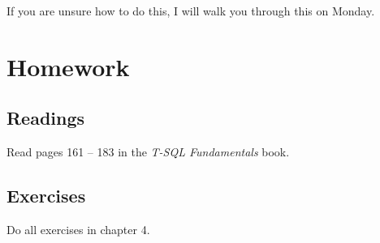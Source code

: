 \documentclass{article}
\begin{document}
        If you are unsure how to do this, I will walk you through this on Monday.
    \section{Homework}


        \subsection{Readings}

        Read pages 161 -- 183 in the \textit{T-SQL Fundamentals} book.
        
        \subsection{Exercises}

        Do all exercises in chapter 4.
\end{document}
